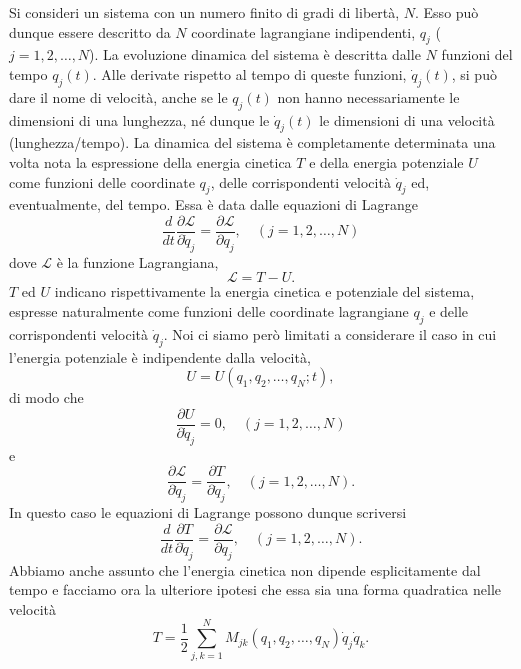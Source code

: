 \documentclass[11pt, a4paper]{book}
\numberwithin{equation}{section}
\begin{document}
Si consideri un sistema con un numero finito di gradi di libertà, $N$. Esso può dunque essere descritto da $N$ coordinate lagrangiane indipendenti, $q_j$ ($j=1, 2, \dots, N$). La evoluzione dinamica del sistema è descritta dalle $N$ funzioni del tempo $q_j(t)$. Alle derivate rispetto al tempo di queste funzioni, $\dot{q}_j(t)$, si può dare il nome di velocità, anche se le $q_j(t)$ non hanno necessariamente le dimensioni di una lunghezza, né dunque le $\dot{q}_j(t)$ le dimensioni di una velocità (lunghezza/tempo). La dinamica del sistema è completamente determinata una volta nota la espressione della energia cinetica $T$ e della energia potenziale $U$ come funzioni delle coordinate $q_j$, delle corrispondenti velocità $\dot{q}_j$ ed, eventualmente, del tempo. Essa è data dalle equazioni di Lagrange
\begin{equation}
\frac{d}{dt} \frac{\partial \mathcal{L}}{\partial \dot{q}_j} = \frac{\partial \mathcal{L}}{\partial q_j}, \quad (j = 1, 2, \dots, N)
\end{equation}
dove $\mathcal{L}$ è la funzione Lagrangiana,
\begin{equation}
\mathcal{L} = T - U.
\end{equation}
$T$ ed $U$ indicano rispettivamente la energia cinetica e potenziale del sistema, espresse naturalmente come funzioni delle coordinate lagrangiane $q_j$ e delle corrispondenti velocità $\dot{q}_j$. Noi ci siamo però limitati a considerare il caso in cui l'energia potenziale è indipendente dalla velocità,
\begin{equation}
U = U(q_1, q_2, \dots, q_N; t),
\end{equation}
di modo che
\begin{equation}
\frac{\partial U}{\partial \dot{q}_j} = 0, \quad (j = 1, 2, \dots, N)
\end{equation}
e
\begin{equation}
\frac{\partial \mathcal{L}}{\partial \dot{q}_j} = \frac{\partial T}{\partial \dot{q}_j}, \quad (j = 1, 2, \dots, N).
\end{equation}
In questo caso le equazioni di Lagrange possono dunque scriversi
\begin{equation}
\frac{d}{dt} \frac{\partial T}{\partial \dot{q}_j} = \frac{\partial \mathcal{L}}{\partial q_j}, \quad (j = 1, 2, \dots, N).
\end{equation}
Abbiamo anche assunto che l'energia cinetica non dipende esplicitamente dal tempo e facciamo ora la ulteriore ipotesi che essa sia una forma quadratica nelle velocità
\begin{equation}
T = \frac{1}{2} \sum_{j,k=1}^{N} M_{jk}(q_1, q_2, \dots, q_N) \dot{q}_j \dot{q}_k.
\end{equation}
\end{document}

